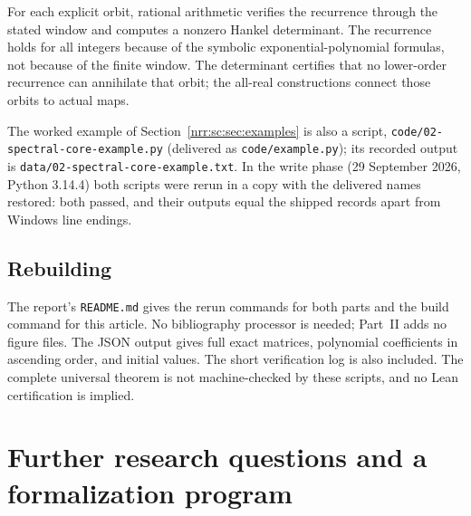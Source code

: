 \documentclass[11pt,letterpaper]{article}
\theoremstyle{definition}
\theoremstyle{remark}
\begin{document}
For each explicit orbit, rational arithmetic verifies the recurrence
through the stated window and computes a nonzero Hankel determinant.
The recurrence holds for all integers because of the symbolic
exponential-polynomial formulas, not because of the finite window.
The determinant certifies that no lower-order recurrence can annihilate
that orbit; the all-real constructions connect those orbits to actual maps.

The worked example of Section~\ref{nrr:sc:sec:examples} is also a script,
\nolinkurl{code/02-spectral-core-example.py} (delivered as
\texttt{code/example.py}); its recorded output is
\nolinkurl{data/02-spectral-core-example.txt}. In the write phase
(29 September 2026, Python 3.14.4) both scripts were rerun in a copy with the
delivered names restored: both passed, and their outputs equal the shipped
records apart from Windows line endings.

\subsection{Rebuilding}

The report's \texttt{README.md} gives the rerun commands for both parts
and the build command for this article. No bibliography processor is
needed; Part~II adds no figure files. The JSON output gives full exact
matrices, polynomial coefficients in ascending order, and initial values.
The short verification log is also included. The complete universal theorem
is not machine-checked by these scripts, and no Lean certification is
implied.

\section{Further research questions and a formalization program}
\label{nrr:sc:sec:research}
\end{document}
